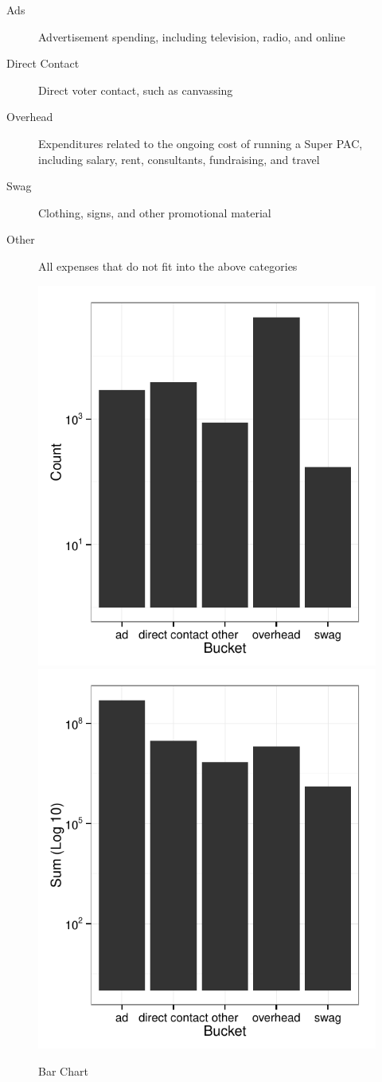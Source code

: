 \documentclass[11pt]{article}\usepackage{graphicx, color}
\newenvironment{knitrout}{}{} %
\begin{document}
\begin{description}
    \item[Ads] Advertisement spending, including television, radio, and online
    \item[Direct Contact] Direct voter contact, such as canvassing
    \item[Overhead] Expenditures related to the ongoing cost of running a Super PAC, including salary, rent, consultants, fundraising, and travel
    \item[Swag] Clothing, signs, and other promotional material
    \item[Other] All expenses that do not fit into the above categories
\end{description}

\begin{knitrout}
\color{fgcolor}\begin{figure}[H]


{\centering \includegraphics[width=.45\textwidth]{figure/bucket_plot1} 
\includegraphics[width=.45\textwidth]{figure/bucket_plot2} 

}

\caption[Bar Chart]{Bar Chart\label{fig:bucket_plot}}
\end{figure}


\end{knitrout}
\end{document}
